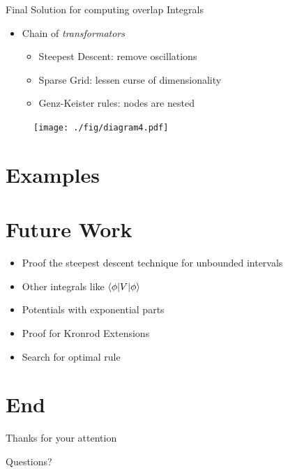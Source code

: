 \documentclass{beamer}
\begin{document}
\begin{frame}{Final Solution for computing overlap Integrals}
  \begin{itemize}
    \item Chain of \emph{transformators}
    \begin{itemize}
      \item Steepest Descent: remove oscillations
      \item Sparse Grid: lessen curse of dimensionality
      \item Genz-Keister rules: nodes are nested
    \end{itemize}
  \end{itemize}
  \begin{figure}
    \centering
    \texttt{[image: ./fig/diagram4.pdf]}
  \end{figure}
\end{frame}



\section{Examples}




\section{Future Work}

\begin{frame}
  \begin{itemize}
    \item Proof the steepest descent technique for unbounded intervals
    \item Other integrals like $\braket{\phi|V|\phi}$
    \item Potentials with exponential parts
    \item Proof for Kronrod Extensions
    \item Search for optimal rule
  \end{itemize}
\end{frame}


\section{End}

\begin{frame}{Thanks for your attention}
  \begin{center}
    {\Huge{Questions?}}
  \end{center}
\end{frame}
\end{document}
